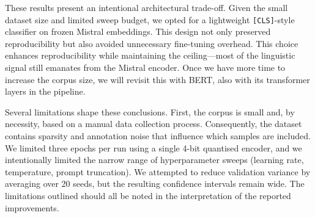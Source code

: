 \documentclass[12pt]{article}
\begin{document}
These results present an intentional architectural trade-off. Given the small dataset size and limited sweep budget, we opted for a lightweight  \texttt{[CLS]}-style classifier on frozen Mistral embeddings. This design not only preserved reproducibility but also avoided unnecessary fine-tuning overhead. This choice enhances reproducibility while maintaining the ceiling\;---\;most of the linguistic signal still emanates from the Mistral encoder. Once we have more time to increase the corpus size, we will revisit this with BERT, also with its transformer layers in the pipeline.

Several limitations shape these conclusions. First, the corpus is small and, by necessity, based on a manual data collection process. Consequently, the dataset contains sparsity and annotation noise that influence which samples are included. We limited three epochs per run using a single 4-bit quantised encoder, and we intentionally limited the narrow range of hyperparameter sweeps (learning rate, temperature, prompt truncation). We attempted to reduce validation variance by averaging over 20 seeds, but the resulting confidence intervals remain wide. The limitations outlined should all be noted in the interpretation of the reported improvements.
\end{document}
